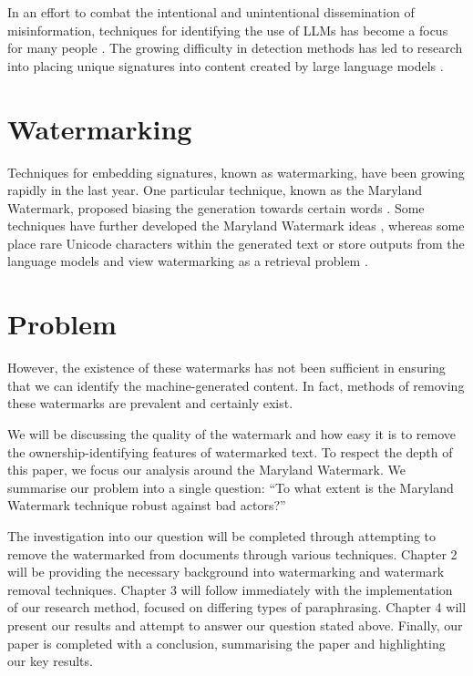 \documentclass{l4proj}
\theoremstyle{definition}
\begin{document}
        In an effort to combat the intentional and unintentional dissemination of misinformation, techniques for identifying the use of LLMs has become a focus for many people \citep{kirchenbauer2023watermark, mitchell2023detectgpt, grinbaum2022ethical}. The growing difficulty in detection methods \citep{sadasivan2023aigenerated} has led to research into placing unique signatures into content created by large language models \citep{openAIclassifier}.

    \section{Watermarking}
        Techniques for embedding signatures, known as watermarking, have been growing rapidly in the last year. One particular technique, known as the Maryland Watermark, proposed biasing the generation towards certain words \citep{kirchenbauer2023watermark}. Some techniques have further developed the Maryland Watermark ideas \citep{liu2024semantic}, whereas some place rare Unicode characters within the generated text \citep{sato2023embarrassingly} or store outputs from the language models and view watermarking as a retrieval problem \citep{krishna2023paraphrasing}.
        
    \section{Problem}
        However, the existence of these watermarks has not been sufficient in ensuring that we can identify the machine-generated content. In fact, methods of removing these watermarks are prevalent and certainly exist. 

        We will be discussing the quality of the watermark and how easy it is to remove the ownership-identifying features of watermarked text. To respect the depth of this paper, we focus our analysis around the Maryland Watermark. We summarise our problem into a single question: ``To what extent is the Maryland Watermark technique robust against bad actors?''

        The investigation into our question will be completed through attempting to remove the watermarked from documents through various techniques. Chapter 2 will be providing the necessary background into watermarking and watermark removal techniques. Chapter 3 will follow immediately with the implementation of our research method, focused on differing types of paraphrasing. Chapter 4 will present our results and attempt to answer our question stated above. Finally, our paper is completed with a conclusion, summarising the paper and highlighting our key results.
\end{document}
